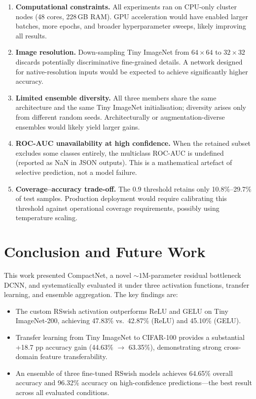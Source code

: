 \documentclass[11pt,letterpaper]{article}
\begin{document}
\begin{enumerate}[noitemsep]
  \item \textbf{Computational constraints.} All experiments ran on CPU-only cluster
        nodes (48 cores, 228\,GB RAM).
        GPU acceleration would have enabled larger batches, more epochs, and broader
        hyperparameter sweeps, likely improving all results.
  \item \textbf{Image resolution.} Down-sampling Tiny ImageNet from $64\!\times\!64$
        to $32\!\times\!32$ discards potentially discriminative fine-grained details.
        A network designed for native-resolution inputs would be expected to achieve
        significantly higher accuracy.
  \item \textbf{Limited ensemble diversity.} All three members share the same
        architecture and the same Tiny ImageNet initialisation; diversity arises only
        from different random seeds.
        Architecturally or augmentation-diverse ensembles would likely yield larger
        gains.
  \item \textbf{ROC-AUC unavailability at high confidence.} When the retained subset
        excludes some classes entirely, the multiclass ROC-AUC is undefined (reported
        as NaN in JSON outputs).
        This is a mathematical artefact of selective prediction, not a model failure.
  \item \textbf{Coverage--accuracy trade-off.} The 0.9 threshold retains only
        10.8\%--29.7\% of test samples.
        Production deployment would require calibrating this threshold against
        operational coverage requirements, possibly using temperature scaling.
\end{enumerate}

\section{Conclusion and Future Work}

This work presented CompactNet, a novel ${\sim}1$M-parameter residual bottleneck
DCNN, and systematically evaluated it under three activation functions, transfer
learning, and ensemble aggregation.
The key findings are:

\begin{itemize}[noitemsep]
  \item The custom RSwish activation outperforms ReLU and GELU on Tiny
        ImageNet-200, achieving 47.83\% vs.\ 42.87\% (ReLU) and 45.10\% (GELU).
  \item Transfer learning from Tiny ImageNet to CIFAR-100 provides a substantial
        +18.7 pp accuracy gain (44.63\% $\to$ 63.35\%), demonstrating strong
        cross-domain feature transferability.
  \item An ensemble of three fine-tuned RSwish models achieves 64.65\% overall
        accuracy and 96.32\% accuracy on high-confidence predictions---the best
        result across all evaluated conditions.
\end{itemize}
\end{document}
